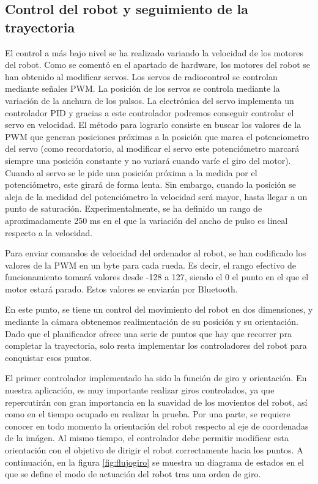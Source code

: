 \subsection{Control del robot y seguimiento de la trayectoria}
\label{control}

El control a más bajo nivel se ha realizado variando la velocidad de los motores del robot. Como se comentó en el apartado de hardware, los motores del robot se han obtenido al modificar servos. Los servos de radiocontrol se controlan mediante señales PWM. La posición de los servos se controla mediante la variación de la anchura de los pulsos. La electrónica del servo implementa un controlador PID y gracias a este controlador podremos conseguir controlar el servo en velocidad. El método para lograrlo consiste en buscar los valores de la PWM que generan posiciones próximas a la posición que marca el potenciometro del servo (como recordatorio, al modificar el servo este potenciómetro marcará siempre una posición constante y no variará cuando varíe el giro del motor). Cuando al servo se le pide una posición próxima a la medida por el potenciómetro, este girará de forma lenta. Sin embargo, cuando la posición se aleja de la medidad del potenciómetro la velocidad será mayor, hasta llegar a un punto de saturación. Experimentalmente, se ha definido un rango de aproximadamente 250 ms en el que la variación del ancho de pulso es lineal respecto a la velocidad.

Para enviar comandos de velocidad del ordenador al robot, se han codificado los valores de la PWM en un byte para cada rueda. Es decir, el rango efectivo de funcionamiento tomará valores desde -128 a 127, siendo el 0 el punto en el que el motor estará parado. Estos valores se enviarán por Bluetooth.

En este punto, se tiene un control del movimiento del robot en dos dimensiones, y mediante la cámara obtenemos realimentación de su posición y su orientación. Dado que el planificador ofrece una serie de puntos que hay que recorrer pra completar la trayectoria, solo resta implementar los controladores del robot para conquistar esos puntos.

El primer controlador implementado ha sido la función de giro y orientación. En nuestra aplicación, es muy importante realizar giros controlados, ya que repercutirán con gran importancia en la suavidad de los movientos del robot, así como en el tiempo ocupado en realizar la prueba. Por una parte, se requiere conocer en todo momento la orientación del robot respecto al eje de coordenadas de la imágen. Al mismo tiempo, el controlador debe permitir modificar esta orientación con el objetivo de dirigir el robot correctamente hacia los puntos. A continuación, en la figura \ref{fig:flujogiro} se muestra un diagrama de estados en el que se define el modo de actuación del robot tras una orden de giro.\\

